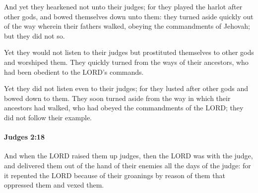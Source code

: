 			\begin{versebox}
					\item[BHS] 
					\item[ASV] And yet they hearkened not unto their judges; for they played the harlot after other gods, and bowed themselves down unto them: they turned aside quickly out of the way wherein their fathers walked, obeying the commandments of Jehovah; but they did not so.
					\item[NIV] Yet they would not listen to their judges but prostituted themselves to other gods and worshiped them. They quickly turned from the ways of their ancestors, who had been obedient to the LORD’s commands.
					\item[NRSV] Yet they did not listen even to their judges; for they lusted after other gods and bowed down to them. They soon turned aside from the way in which their ancestors had walked, who had obeyed the commandments of the LORD; they did not follow their example.
			\end{versebox}

		\paragraph{Judges 2:18} %
			\label{JUDGES-2-18}

			And when the LORD raised them up judges, then the LORD was with the judge, and delivered them out of the hand of their enemies all the days of the judge: for it repented the LORD because of their groanings by reason of them that oppressed them and vexed them.


